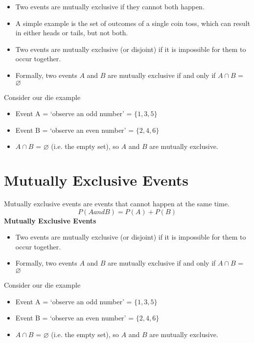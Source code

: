\documentclass[]{report}
\begin{document}
\begin{itemize}
\item Two events are mutually exclusive if they cannot both happen. 
\item A simple example is the set of outcomes of a single coin toss, which can result in either heads or tails, but not both.
\end{itemize}

\begin{itemize}
\item Two events are mutually exclusive (or disjoint) if it is impossible for
them to occur together.
\item Formally, two events $A$ and $B$ are mutually exclusive if and only if
$A\cap B$ = $\varnothing$ \end{itemize}\bigskip
Consider our die example
\begin{itemize}
\item Event A = `observe an odd number' = $\{1,3,5\}$
\item Event B = `observe an even number' = $\{2,4,6\}$

\item $A\cap B$ = $\varnothing$ (i.e. the empty set), so $A$ and $B$ are mutually exclusive.
\end{itemize}



\section{Mutually Exclusive Events}
Mutually exclusive events are events that cannot happen at the same time.
\[ P(A and B) = P(A) + P(B) \]
\noindent \textbf{Mutually Exclusive Events}
\begin{itemize}
\item Two events are mutually exclusive (or disjoint) if it is impossible for
them to occur together.
\item Formally, two events $A$ and $B$ are mutually exclusive if and only if
$A\cap B$ = $\varnothing$ \end{itemize}\bigskip
Consider our die example
\begin{itemize} 
\item Event A = `observe an odd number' = $\{1,3,5\}$
\item Event B = `observe an even number' = $\{2,4,6\}$

\item $A\cap B$ = $\varnothing$ (i.e. the empty set), so $A$ and $B$ are mutually exclusive.
\end{itemize}
\end{document}
